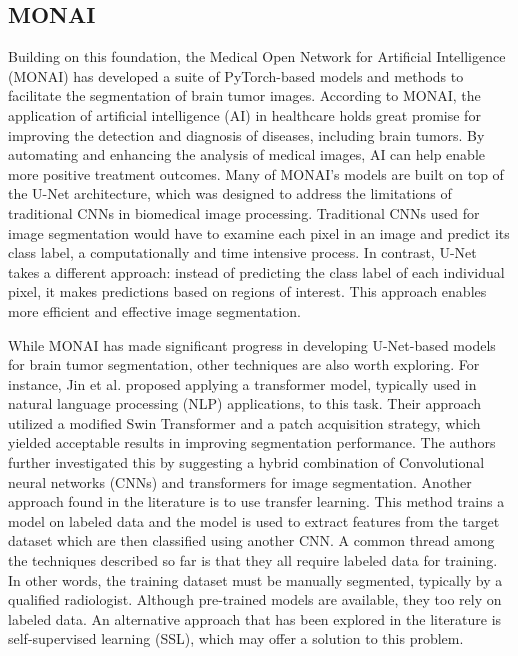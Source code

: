 \documentclass[12pt, onecolumn]{IEEEtran}
\begin{document}
\subsection{MONAI}
Building on this foundation, the Medical Open Network for Artificial Intelligence (MONAI) has developed a suite of PyTorch-based models and methods to facilitate the segmentation of brain tumor images.  According to MONAI, the application of artificial intelligence (AI) in healthcare holds great promise for improving the detection and diagnosis of diseases, including brain tumors. By automating and enhancing the analysis of medical images, AI can help enable more positive treatment outcomes\cite{cardoso2022}. Many of MONAI's models are built on top of the U-Net architecture, which was designed to address the limitations of traditional CNNs in biomedical image processing. Traditional CNNs used for image segmentation would have to examine each pixel in an image and predict its class label, a computationally and time intensive process. In contrast, U-Net takes a different approach: instead of predicting the class label of each individual pixel, it makes predictions based on regions of interest\cite{ronneberger2015}. This approach enables more efficient and effective image segmentation.
 
While MONAI has made significant progress in developing U-Net-based models for brain tumor segmentation, other techniques are also worth exploring. For instance, Jin et al.\cite{jin2026} proposed applying a transformer model, typically used in natural language processing (NLP) applications, to this task. Their approach utilized a modified Swin Transformer and a patch acquisition strategy, which yielded acceptable results in improving segmentation performance. The authors further investigated this by suggesting a hybrid combination of Convolutional neural networks (CNNs) and transformers for image segmentation\cite{jin2026}.  Another approach found in the literature is to use transfer learning.  This method trains a model on labeled data and the model is used to extract features from the target dataset which are then classified using another CNN\cite{chen2019}. A common thread among the techniques described so far is that they all require labeled data for training. In other words, the training dataset must be manually segmented, typically by a qualified radiologist. Although pre-trained models are available, they too rely on labeled data. An alternative approach that has been explored in the literature is self-supervised learning (SSL), which may offer a solution to this problem.  
\end{document}
